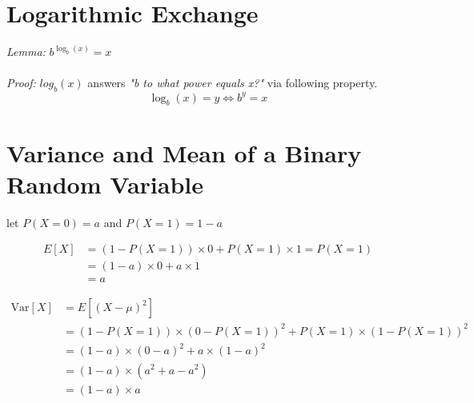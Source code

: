 \documentclass[11pt]{article}
\begin{document}
\begin{appendices}
\section{Logarithmic Exchange}
\textit{Lemma:} $b^{\log_{b}(x)} = x$
\\ \\
\textit{Proof:} $log_{b}(x)$ answers \textit{"b to what power equals x?"} via following property.
\begin{equation}
\log_{b}(x) = y \Leftrightarrow b^{y} = x
\end{equation}
\section{Variance and Mean of a Binary Random Variable}

let $P(X=0) = a$ and $P(X=1) = 1 - a$

\begin{equation} \label{mean_x}
\begin{split}
E[X] & = (1 - P(X=1)) \times 0 + P(X=1) \times 1 = P(X=1) \\
& = (1 - a) \times 0 + a \times 1 \\
& = a
\end{split}
\end{equation}

\begin{equation} \label{var_x}
\begin{split}
\mathrm{Var}[X] & = E[(X-\mu)^2] \\
& = (1 - P(X=1)) \times (0 - P(X=1))^2 + P(X=1) \times (1 - P(X=1))^2\\
& = (1 - a) \times (0 - a)^2 + a \times (1 - a)^2 \\
& = (1 - a) \times (a^2 +a - a^2) \\
& = (1 - a) \times a
\end{split}
\end{equation}

\end{appendices}
\end{document}
